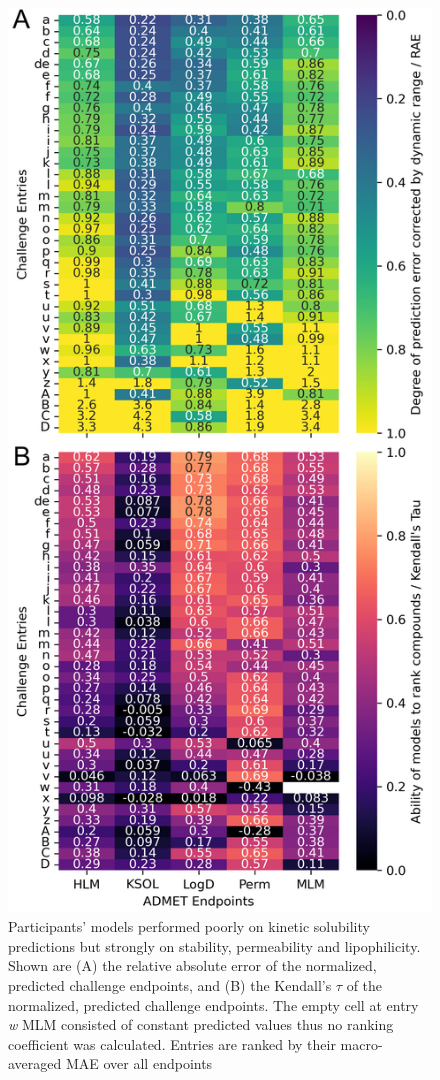\documentclass[journal=jcim,manuscript=article]{achemso}
\begin{document}
\begin{figure}
    \includegraphics[scale=0.6]{04_figs_leaderboards/heatmaps.png}
  \caption{Participants' models performed poorly on kinetic solubility predictions but strongly on stability, permeability and lipophilicity. Shown are (A) the relative absolute error of the normalized, predicted challenge endpoints, and (B) the Kendall's $\tau$ of the normalized, predicted challenge endpoints. The empty cell at entry \textit{w} MLM consisted of constant predicted values thus no ranking coefficient was calculated. Entries are ranked by their macro-averaged MAE over all endpoints}
  \label{fgr:heatmaps_admet}
\end{figure}
\end{document}
